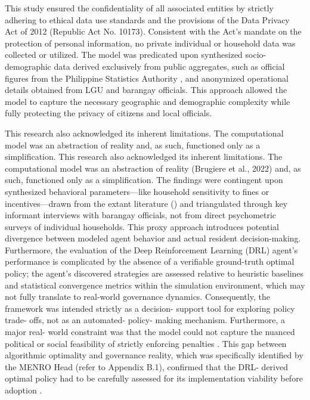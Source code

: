 This study ensured the confidentiality of all associated entities by strictly adhering to ethical data use standards and the provisions of the Data Privacy Act of 2012 (Republic Act No. 10173). Consistent with the Act’s mandate on the protection of personal information, no private individual or household data was collected or utilized. The model was predicated upon synthesized socio-demographic data derived exclusively from public aggregates, such as official figures from the Philippine Statistics Authority \citep{PSA2024}, and anonymized operational details obtained from LGU and barangay officials. This approach allowed the model to capture the necessary geographic and demographic complexity \citep{Jimenez2025} while fully protecting the privacy of citizens and local officials.

This research also acknowledged its inherent limitations. The computational model was an abstraction of reality \citep{Brugiere2022} and, as such, functioned only as a simplification. This research also acknowledged its inherent limitations. The computational model was an abstraction of reality (Brugiere et al., 2022) and, as such, functioned only as a simplification. The findings were contingent upon synthesized behavioral parameters—like household sensitivity to fines or incentives—drawn from the extant literature (\cite{Chen2023,MuZhang2021}) and triangulated through key informant interviews with barangay officials, not from direct psychometric surveys of individual households. This proxy approach introduces potential divergence between modeled agent behavior and actual resident decision-making. Furthermore, the evaluation of the Deep Reinforcement Learning (DRL) agent's performance is complicated by the absence of a verifiable ground-truth optimal policy; the agent's discovered strategies are assessed relative to heuristic baselines and statistical convergence metrics within the simulation environment, which may not fully translate to real-world governance dynamics. Consequently, the framework was intended strictly as a decision- support tool for exploring policy trade- offs, not as an automated- policy- making mechanism. Furthermore, a major real- world constraint was that the model could not capture the nuanced political or social feasibility of strictly enforcing penalties \citep{Nishimura2022}. This gap between algorithmic optimality and governance reality, which was specifically identified by the MENRO Head (refer to Appendix B.1), confirmed that the DRL- derived optimal policy had to be carefully assessed for its implementation viability before adoption \citep{Dalugdog2021}.